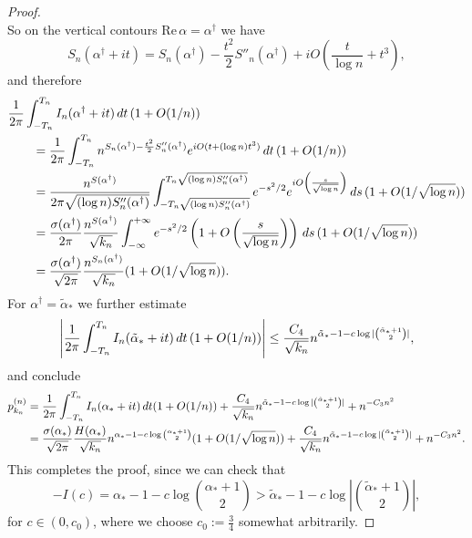 \documentclass[10pt,a4paper]{amsart}
\newcommand{\dint}{\textup{d}}
\begin{document}
\begin{proof}
\begin{equation*}
    \end{equation*}
    So on the vertical contours $\mathrm{Re}\,\alpha=\alpha^\dag$ we have
    \begin{equation*}
        S_n(\alpha^\dag+it) = S_n(\alpha^\dag) - \frac{t^2}{2} S''_n(\alpha^\dag) + iO\left(\frac{t}{\log n}+t^3\right),
    \end{equation*}
    and therefore
    \begin{align*}
            &\frac{1}{2\pi} \int_{-T_n}^{T_n} I_n(\alpha^\dag+it) \, \dint t\, (1+O(1/n))\\
            &\qquad=\frac{1}{2\pi} \int_{-T_n}^{T_n} n^{S_n(\alpha^\dag)-\frac{t^2}{2} S''_n(\alpha^\dag)} e^{i O(t+(\log n)t^3)} \, \dint t\, (1+O(1/n))\\
            &\qquad= \frac{n^{S(\alpha^\dag)}}{2\pi \sqrt{(\log n)S''_n(\alpha^\dag)}} \int_{-T_n\sqrt{(\log n)S''_n(\alpha^\dag)}}^{T_n\sqrt{(\log n)S''_n(\alpha^\dag)}} e^{-s^2/2} e^{i O\left(\frac{s}{\sqrt{\log n}}\right)} \,\dint s\, (1+O(1/\sqrt{\log n}))\\
            &\qquad= \frac{\sigma(\alpha^\dag)}{2\pi} \frac{n^{S(\alpha^\dag)}}{\sqrt{k_n}} \int_{-\infty}^{+\infty} e^{-s^2/2} \left(1+O\left(\frac{s}{\sqrt{\log n}}\right)\right)\,\dint s\, (1+O(1/\sqrt{\log n}))\\
            &\qquad= \frac{\sigma(\alpha^\dag)}{\sqrt{2\pi}} \frac{n^{ S_n(\alpha^\dag)}}{\sqrt{k_n}} (1+O(1/\sqrt{\log n})).
    \end{align*}
    For $\alpha^\dag=\tilde{\alpha}_*$ we further estimate
    \begin{equation*}
        \left|\frac{1}{2\pi} \int_{-T_n}^{T_n} I_n(\tilde{\alpha}_*+it) \, \dint t\, (1+O(1/n)) \right|
        \leq \frac{C_4}{\sqrt{k_n}} n^{\tilde{\alpha}_*-1-c \log|\binom{\tilde{\alpha}_*+1}{2}|},
    \end{equation*}
    and conclude
    \begin{align*}
        p_{k_n}^{(n)} 
        &= \frac{1}{2\pi} \int_{-T_n}^{T_n} I_n(\alpha_*+it) \, \dint t (1+O(1/n)) 
            +  \frac{C_4}{\sqrt{k_n}} n^{\tilde{\alpha}_*-1-c \log|\binom{\tilde{\alpha}_*+1}{2}|} + n^{-C_3n^2}\\
        &=\frac{\sigma(\alpha_*)}{\sqrt{2\pi}} \frac{H(\alpha_*)}{\sqrt{k_n}}n^{\alpha_*-1-c\log\binom{\alpha_*+1}{2}} (1+O(1/\sqrt{\log n}))
            +  \frac{C_4}{\sqrt{k_n}} n^{\tilde{\alpha}_*-1-c \log|\binom{\tilde{\alpha}_*+1}{2}|} + n^{-C_3n^2}.
    \end{align*}
    This completes the proof, since we can check that 
    \begin{equation*}
        -I(c) = \alpha_*-1-c\log\binom{\alpha_*+1}{2} > \tilde{\alpha}_*-1-c \log\left|\binom{\tilde{\alpha}_*+1}{2}\right|,
    \end{equation*}
    for $c\in (0,c_0)$, where we choose $c_0:=\frac{3}{4}$ somewhat arbitrarily.
\end{proof}
\end{document}
